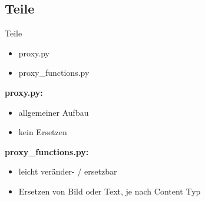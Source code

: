 \documentclass [xcolor=dvipsnames] {beamer}
\begin{document}
\subsection{Teile}
\begin{frame}
	{\sc Teile}
	\begin{itemize}
		\item proxy.py
		\item proxy\_functions.py
	\end{itemize}
\end{frame}
\note
{
	{\bf proxy.py:}
	\begin{itemize}
		\item allgemeiner Aufbau
		\item kein Ersetzen
	\end{itemize}
	{\bf proxy\_functions.py:}
	\begin{itemize}
		\item leicht veränder- / ersetzbar
		\item Ersetzen von Bild oder Text, je nach Content Typ
	\end{itemize}
}
\end{document}
